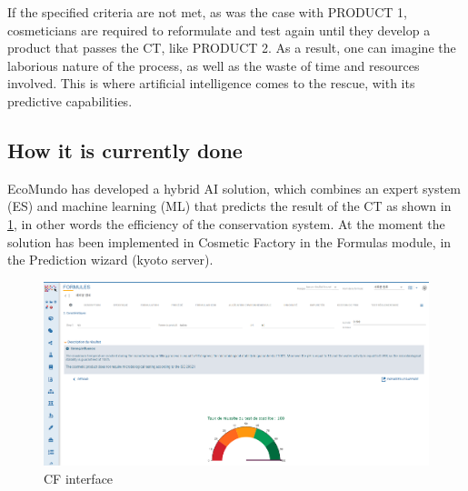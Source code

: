 \documentclass[a4paper,12pt,twoside]{report}
\begin{document}
If the specified criteria are not met, as was the case with PRODUCT 1, cosmeticians are required to reformulate and test again until they develop a product that passes the CT, like PRODUCT 2. As a result, one can imagine the laborious nature of the process, as well as the waste of time and resources involved. This is where artificial intelligence comes to the rescue, with its predictive capabilities.

\subsection{How it is currently done}
EcoMundo has developed a hybrid AI solution, which combines an expert system (ES) and machine learning (ML) that predicts the result of the CT as shown in \ref{cfinterface}, in other words the efficiency of the conservation system. 
At the moment the solution has been implemented in Cosmetic Factory in the Formulas module, in the Prediction wizard (kyoto server).
\begin{figure}[H]
		\includegraphics[width=\textwidth]{images/kyoto}
	\caption[Cosmetic Factory Interface for CT]{CF interface}
	\label{cfinterface}
\end{figure}
\end{document}

